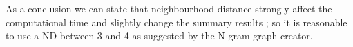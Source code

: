 As a conclusion we can state that neighbourhood distance strongly affect the computational time and slightly change the summary results ; so it is reasonable to use a ND between 3 and 4 as suggested by the N-gram graph creator.



